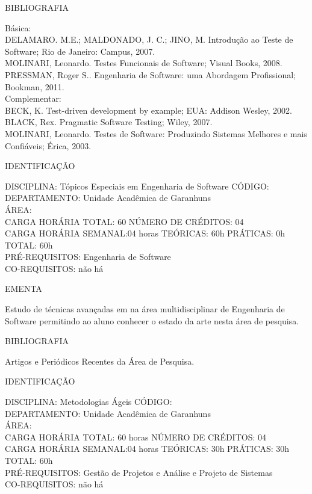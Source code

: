 \documentclass[
	12pt,				%
	openright,			%
  oneside,     %
	a4paper,			%
	english,			%
	french,				%
	spanish,			%
	brazil				%
	]{abntex2}
\begin{document}
\begin{apendicesenv}
BIBLIOGRAFIA 

Básica:\\
DELAMARO. M.E.; MALDONADO, J. C.; JINO, M. Introdução ao Teste de
Software; Rio de Janeiro: Campus, 2007.\\
MOLINARI, Leonardo. Testes Funcionais de Software; Visual Books, 2008.\\
PRESSMAN, Roger S.. Engenharia de Software: uma Abordagem Profissional;
Bookman, 2011.\\
Complementar:\\
BECK, K. Test-driven development by example; EUA: Addison Wesley, 2002.\\
BLACK, Rex. Pragmatic Software Testing; Wiley, 2007.\\
MOLINARI, Leonardo. Testes de Software: Produzindo Sistemas Melhores e
mais Confiáveis; Érica, 2003.

\newpage IDENTIFICAÇÃO

DISCIPLINA: Tópicos Especiais em Engenharia de Software CÓDIGO: \\
DEPARTAMENTO: Unidade Acadêmica de Garanhuns\\
ÁREA: \\
CARGA HORÁRIA TOTAL: 60 NÚMERO DE CRÉDITOS: 04\\
CARGA HORÁRIA SEMANAL:04 horas TEÓRICAS: 60h PRÁTICAS: 0h TOTAL: 60h\\
PRÉ-REQUISITOS: Engenharia de Software\\
CO-REQUISITOS: não há

EMENTA 

Estudo de técnicas avançadas em na área multidisciplinar de Engenharia
de Software permitindo ao aluno conhecer o estado da arte nesta área de
pesquisa.

BIBLIOGRAFIA 

Artigos e Periódicos Recentes da Área de Pesquisa.

\newpage IDENTIFICAÇÃO

DISCIPLINA: Metodologias Ágeis CÓDIGO: \\
DEPARTAMENTO: Unidade Acadêmica de Garanhuns\\
ÁREA: \\
CARGA HORÁRIA TOTAL: 60 horas NÚMERO DE CRÉDITOS: 04\\
CARGA HORÁRIA SEMANAL:04 horas TEÓRICAS: 30h PRÁTICAS: 30h TOTAL: 60h\\
PRÉ-REQUISITOS: Gestão de Projetos e Análise e Projeto de Sistemas\\
CO-REQUISITOS: não há


\end{apendicesenv}
\end{document}
